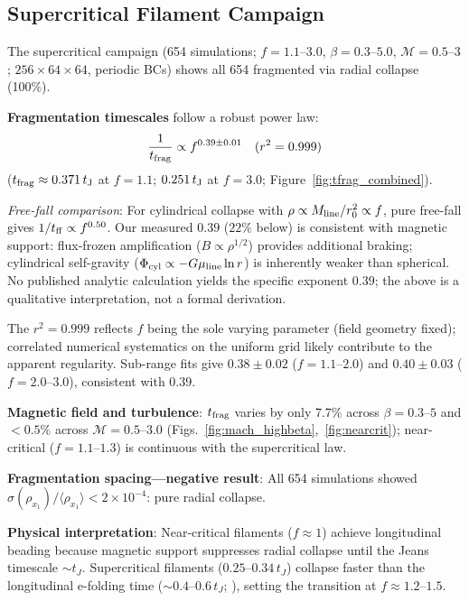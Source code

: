 \documentclass[twoside,twocolumn]{mnras}
\begin{document}
\subsection{Supercritical Filament Campaign}
\label{sec:supercrit}

The supercritical campaign (654 simulations; $f = 1.1$--$3.0$, $\beta = 0.3$--$5.0$,
$\mathcal{M} = 0.5$--$3$; $256 \times 64 \times 64$, periodic BCs) shows all 654
fragmented via radial collapse (100\%).

\textbf{Fragmentation timescales} follow a robust power law:
\begin{equation}
\frac{1}{t_{\rm frag}} \propto f^{0.39 \pm 0.01} \quad (r^2 = 0.999)
\label{eq:powerlaw}
\end{equation}
($t_{\rm frag} \approx 0.371\,t_{\rm J}$ at $f=1.1$; $0.251\,t_{\rm J}$ at $f=3.0$;
Figure~\ref{fig:tfrag_combined}).

\textit{Free-fall comparison}: For cylindrical collapse with $\rho \propto
M_{\rm line}/r_0^2 \propto f$, pure free-fall gives $1/t_{\rm ff} \propto f^{0.50}$.
Our measured $0.39$ ($22\%$ below) is consistent with magnetic support: flux-frozen
amplification ($B \propto \rho^{1/2}$) provides additional braking; cylindrical
self-gravity ($\Phi_{\rm cyl} \propto -G\mu_{\rm line}\ln r$) is inherently weaker than
spherical. No published analytic calculation yields the specific exponent $0.39$; the
above is a qualitative interpretation, not a formal derivation.

The $r^2 = 0.999$ reflects $f$ being the sole varying parameter (field geometry fixed);
correlated numerical systematics on the uniform grid likely contribute to the apparent
regularity. Sub-range fits give $0.38 \pm 0.02$ ($f=1.1$--$2.0$) and $0.40 \pm 0.03$
($f=2.0$--$3.0$), consistent with $0.39$.

\textbf{Magnetic field and turbulence}: $t_{\rm frag}$ varies by only 7.7\% across $\beta=0.3$--$5$ and $<0.5\%$ across $\mathcal{M}=0.5$--$3.0$ (Figs.~\ref{fig:mach_highbeta},~\ref{fig:nearcrit}); near-critical ($f=1.1$--$1.3$) is continuous with the supercritical law.

\textbf{Fragmentation spacing---negative result}: All 654 simulations showed
$\sigma(\rho_{x_1})/\langle\rho_{x_1}\rangle < 2\times 10^{-4}$: pure radial collapse.

\textbf{Physical interpretation}: Near-critical filaments ($f \approx 1$) achieve longitudinal beading because magnetic support suppresses radial collapse until the Jeans timescale ${\sim}t_J$. Supercritical filaments ($0.25$--$0.34\,t_J$) collapse faster than the longitudinal e-folding time (${\sim}0.4$--$0.6\,t_J$; \citealt{Nagasawa1987}), setting the transition at $f \approx 1.2$--$1.5$.
\end{document}
